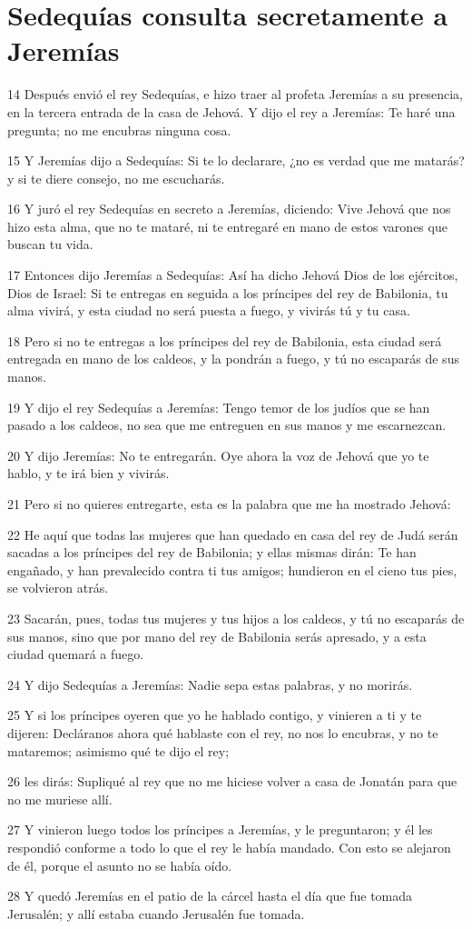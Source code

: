 \section*{Sedequías consulta secretamente a Jeremías}

\par 14 Después envió el rey Sedequías, e hizo traer al profeta Jeremías a su presencia, en la tercera entrada de la casa de Jehová. Y dijo el rey a Jeremías: Te haré una pregunta; no me encubras ninguna cosa.
\par 15 Y Jeremías dijo a Sedequías: Si te lo declarare, ¿no es verdad que me matarás? y si te diere consejo, no me escucharás.
\par 16 Y juró el rey Sedequías en secreto a Jeremías, diciendo: Vive Jehová que nos hizo esta alma, que no te mataré, ni te entregaré en mano de estos varones que buscan tu vida.
\par 17 Entonces dijo Jeremías a Sedequías: Así ha dicho Jehová Dios de los ejércitos, Dios de Israel: Si te entregas en seguida a los príncipes del rey de Babilonia, tu alma vivirá, y esta ciudad no será puesta a fuego, y vivirás tú y tu casa.
\par 18 Pero si no te entregas a los príncipes del rey de Babilonia, esta ciudad será entregada en mano de los caldeos, y la pondrán a fuego, y tú no escaparás de sus manos.
\par 19 Y dijo el rey Sedequías a Jeremías: Tengo temor de los judíos que se han pasado a los caldeos, no sea que me entreguen en sus manos y me escarnezcan.
\par 20 Y dijo Jeremías: No te entregarán. Oye ahora la voz de Jehová que yo te hablo, y te irá bien y vivirás.
\par 21 Pero si no quieres entregarte, esta es la palabra que me ha mostrado Jehová:
\par 22 He aquí que todas las mujeres que han quedado en casa del rey de Judá serán sacadas a los príncipes del rey de Babilonia; y ellas mismas dirán: Te han engañado, y han prevalecido contra ti tus amigos; hundieron en el cieno tus pies, se volvieron atrás.
\par 23 Sacarán, pues, todas tus mujeres y tus hijos a los caldeos, y tú no escaparás de sus manos, sino que por mano del rey de Babilonia serás apresado, y a esta ciudad quemará a fuego.
\par 24 Y dijo Sedequías a Jeremías: Nadie sepa estas palabras, y no morirás.
\par 25 Y si los príncipes oyeren que yo he hablado contigo, y vinieren a ti y te dijeren: Decláranos ahora qué hablaste con el rey, no nos lo encubras, y no te mataremos; asimismo qué te dijo el rey;
\par 26 les dirás: Supliqué al rey que no me hiciese volver a casa de Jonatán para que no me muriese allí.
\par 27 Y vinieron luego todos los príncipes a Jeremías, y le preguntaron; y él les respondió conforme a todo lo que el rey le había mandado. Con esto se alejaron de él, porque el asunto no se había oído.
\par 28 Y quedó Jeremías en el patio de la cárcel hasta el día que fue tomada Jerusalén; y allí estaba cuando Jerusalén fue tomada. 

